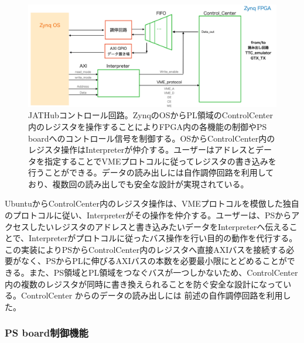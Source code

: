 \begin{figure} 
\centering
\includegraphics[width=16cm]{fig/QAQC/JATHubccenter.png}
\caption[JATHubコントロール回路]{JATHubコントロール回路。ZynqのOSからPL領域のControlCenter内のレジスタを操作することによりFPGA内の各機能の制御やPS boardへのコントロール信号を制御する。OSからControlCenter内のレジスタ操作はInterpreterが仲介する。ユーザーはアドレスとデータを指定することでVMEプロトコルに従ってレジスタの書き込みを行うことができる。データの読み出しには自作調停回路を利用しており、複数回の読み出しでも安全な設計が実現されている。}
\label{JATHubccenter}
\end{figure}

UbuntuからControlCenter内のレジスタ操作は、VMEプロトコルを模倣した独自のプロトコルに従い、Interpreterがその操作を仲介する。ユーザーは、PSからアクセスしたいレジスタのアドレスと書き込みたいデータをInterpreterへ伝えることで、Interpreterがプロトコルに従ったバス操作を行い目的の動作を代行する。この実装によりPSからControlCenter内のレジスタへ直接AXIバスを接続する必要がなく、PSからPLに伸びるAXIバスの本数を必要最小限にとどめることができる。また、PS領域とPL領域をつなぐバスが一つしかないため、ControlCenter内の複数のレジスタが同時に書き換えられることを防ぐ安全な設計になっている。ControlCenter からのデータの読み出しには 前述の自作調停回路を利用した。

\subsubsection{PS board制御機能}


